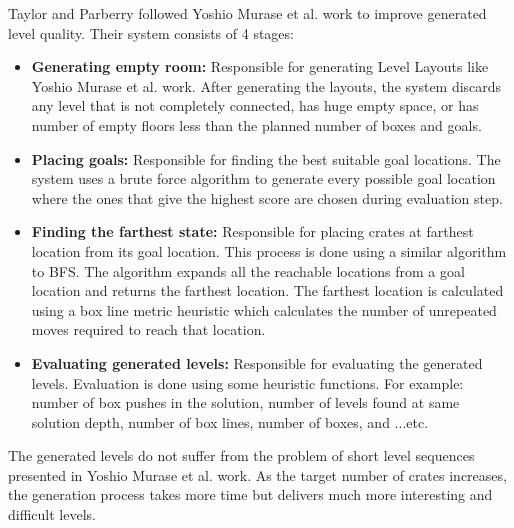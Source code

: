 Taylor and Parberry\cite{sokobanLevelGenerationNew} followed Yoshio Murase et al.\cite{sokobanLevelGenerationOld} work to improve generated level quality. Their system consists of 4 stages:
\begin{itemize} \itemsep0pt \parskip0pt 
	\item \textbf{Generating empty room:} Responsible for generating Level Layouts like Yoshio Murase et al.\cite{sokobanLevelGenerationOld} work. After generating the layouts, the system discards any level that is not completely connected, has huge empty space, or has number of empty floors less than the planned number of boxes and goals.
	\item \textbf{Placing goals:} Responsible for finding the best suitable goal locations. The system uses a brute force algorithm to generate every possible goal location where the ones that give the highest score are chosen during evaluation step.
	\item \textbf{Finding the farthest state:} Responsible for placing crates at farthest location from its goal location. This process is done using a similar algorithm to BFS. The algorithm expands all the reachable locations from a goal location and returns the farthest location. The farthest location is calculated using a box line metric heuristic which calculates the number of unrepeated moves required to reach that location.
	\item \textbf{Evaluating generated levels:} Responsible for evaluating the generated levels. Evaluation is done using some heuristic functions. For example: number of box pushes in the solution, number of levels found at same solution depth, number of box lines, number of boxes, and ...etc.  
\end{itemize}
The generated levels do not suffer from the problem of short level sequences presented in Yoshio Murase et al.\cite{sokobanLevelGenerationOld} work. As the target number of crates increases, the generation process takes more time but delivers much more interesting and difficult levels.


